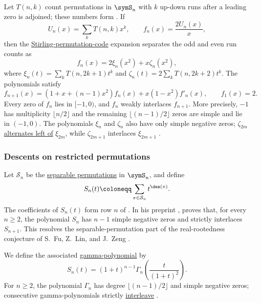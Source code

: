 \begin{example*}
Let $T(n,k)$ count permutations in $\symS_n$ with $k$ up-down runs after a
leading zero is adjoined; these numbers form .  If
\[
 U_n(x)=\sum_kT(n,k)x^k, \qquad f_n(x)=\frac{2U_n(x)}x,
\]
then the \hyperref[permutationsStirling]{Stirling-permutation-code}
expansion separates the odd and even run counts as
\[
 f_n(x)=2\xi_n(x^2)+x\zeta_n(x^2),
\]
where
$\xi_n(t)=\sum_kT(n,2k+1)t^k$ and
$\zeta_n(t)=2\sum_kT(n,2k+2)t^k$.
The polynomials satisfy
\[
 f_{n+1}(x)=(1+x+(n-1)x^2)f_n(x)+x(1-x^2)f'_n(x),
 \qquad f_1(x)=2.
\]
Every zero of $f_n$ lies in $[-1,0)$, and $f_n$ weakly interlaces
$f_{n+1}$.  More precisely, $-1$ has multiplicity $\lfloor n/2\rfloor$
and the remaining $\lfloor(n-1)/2\rfloor$ zeros are simple and lie in
$(-1,0)$.  The polynomials $\xi_n$ and $\zeta_n$ also have only simple
negative zeros; $\zeta_{2m}$
\hyperref[alternatesLeftOf]{alternates left of} $\xi_{2m}$, while
$\zeta_{2m+1}$ interlaces $\xi_{2m+1}$
\cite[Thm.~6]{MaQiYehYeh2024x}.
\end{example*}


\subsubsection[restrictedPermutationDescentsRealRooted]{Descents on restricted permutations}

\begin{example*}
\label{separableDescentRealRooted}
Let $\mathcal S_n$ be the \hyperref[permSeparable]{separable permutations}
in $\symS_n$, and define
\[
 S_n(t) \coloneqq \sum_{\pi\in\mathcal S_n}t^{\des(\pi)}.
\]
The coefficients of $S_n(t)$ form row $n$ of .
In his preprint \cite[Thm.~1.1]{Zhang2026SeparableInterlacing},
 proves that, for every $n\geq2$, the polynomial $S_n$
has $n-1$ simple negative zeros and strictly interlaces $S_{n+1}$.
This resolves the separable-permutation part of the real-rootedness
conjecture of S.~Fu, Z.~Lin, and J.~Zeng \cite{FuLinZeng2018}.

We define the associated \hyperref[gammaPositivity]{gamma-polynomial} by
\[
 S_n(t)=(1+t)^{n-1}\Gamma_n\!\left(\frac{t}{(1+t)^2}\right).
\]
For $n\geq2$, the polynomial $\Gamma_n$ has degree
$\lfloor(n-1)/2\rfloor$ and simple negative zeros; consecutive
gamma-polynomials strictly \hyperref[interleavesPolynomial]{interleave}
\cite[Thm.~1.2]{Zhang2026SeparableInterlacing}.
\end{example*}

